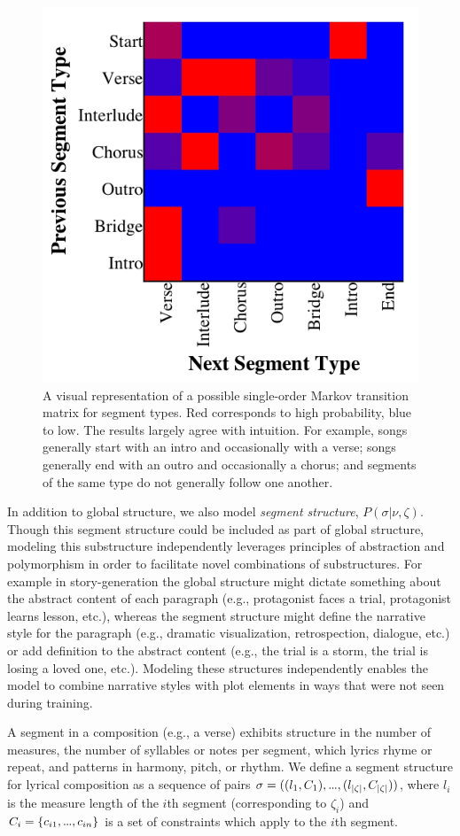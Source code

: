 \documentclass[phd,electronic,oneside,twosidetoc,letterpaper,chaptercenter,parttop,lol,lof,lot]{byumsphd}
\newcommand\mydots{\hbox to .75em{.\hss.\hss.}}
\begin{document}
\begin{figure}
	\centering
	\includegraphics[width=.6\linewidth]{segment_transitions}
	\caption{\label{fig:segment_transitions} A visual representation of a possible single-order Markov transition matrix for segment types. Red corresponds to high probability, blue to low. The results largely agree with intuition. For example, songs generally start with an intro and occasionally with a verse; songs generally end with an outro and occasionally a chorus; and segments of the same type do not generally follow one another.}
\end{figure}

In addition to global structure, we also model \emph{segment structure}, $P(\sigma|\nu,\zeta)$. Though this segment structure could be included as part of global structure, modeling this substructure independently leverages principles of abstraction and polymorphism in order to facilitate novel combinations of substructures. For example in story-generation the global structure might dictate something about the abstract content of each paragraph (e.g., protagonist faces a trial, protagonist learns lesson, etc.), whereas the segment structure might define the narrative style for the paragraph (e.g., dramatic visualization, retrospection, dialogue, etc.) or add definition to the abstract content (e.g., the trial is a storm, the trial is losing a loved one, etc.). Modeling these structures independently enables the model to combine narrative styles with plot elements in ways that were not seen during training.

A segment in a composition (e.g., a verse) exhibits structure in the number of measures, the number of syllables or notes per segment, which lyrics rhyme or repeat, and patterns in harmony, pitch, or rhythm. We define a segment structure for lyrical composition as a sequence of pairs $\sigma = ((l_1,C_1),\mydots,(l_{|\zeta|},C_{|\zeta|}))$, where $l_i$ is the measure length of the $i$th segment (corresponding to $\zeta_i$) and $C_i = \{{c_{i1},\mydots,c_{in}}\}$ is a set of constraints which apply to the $i$th segment.
\end{document}
